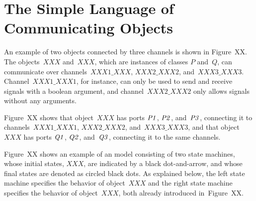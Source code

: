 \section{The Simple Language of Communicating Objects}
\label{sec:prototype-semantics:dsl}
\begin{address}
An example of two objects connected by three channels is shown in Figure~XX.
The objects~$XXX$ and~$XXX$, which are instances of classes $P$ and~$Q$, can communicate over channels~$XXX1\_XXX$, $XXX2\_XXX2$, and~$XXX3\_XXX3$.
Channel~$XXX1\_XXX1$, for instance, can only be used to send and receive signals with a boolean argument, and channel~$XXX2\_XXX2$ only allows signals without any arguments.



Figure~XX shows that object~$XXX$ has ports $\it{P1}$, $\it{P2}$, and~$\it{P3}$, connecting it to channels~$XXX1\_XXX1$, $XXX2\_XXX2$, and~$XXX3\_XXX3$, and that object $XXX$ has ports $\it{Q1}$, $\it{Q2}$, and~$\it{Q3}$, connecting it to the same channels.

Figure~XX shows an example of an \SLCO model consisting of two state machines, whose initial states, $XXX$, are indicated by a black dot-and-arrow, and whose final states are denoted as circled black dots.
As explained below, the left state machine specifies the behavior of object~$XXX$ and the right state machine specifies the behavior of object~$XXX$, both already introduced  in~Figure~XX.


\end{address}
